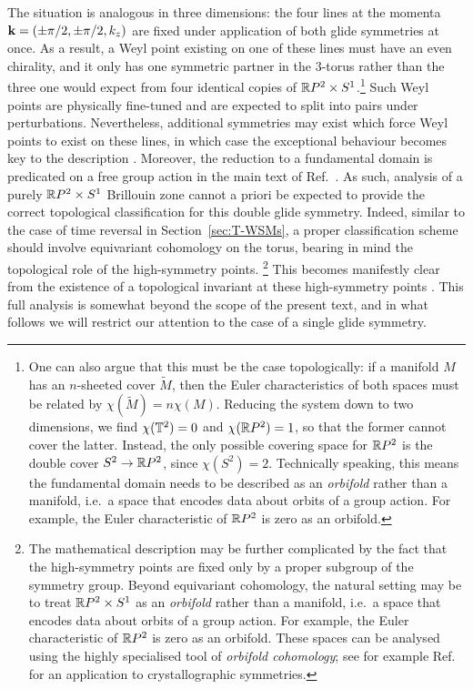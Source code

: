 The situation is analogous in three dimensions: the four lines at the momenta $\vb{k} = (\pm\pi/2,\pm\pi/2,k_z)$ are fixed under application of both glide symmetries at once. As a result, a Weyl point existing on one of these lines must have an even chirality, and it only has one symmetric partner in the 3-torus rather than the three one would expect from four identical copies of $\mathbb{R} P^2\times S^1$.\footnote{
	One can also argue that this must be the case topologically: if a manifold $M$ has an $n$-sheeted cover $\tilde{M}$, then the Euler characteristics of both spaces must be related by $\chi(\tilde{M}) = n\chi(M)$. Reducing the system down to two dimensions, we find $\chi(\mathbb{T}^2) = 0$ and $\chi(\mathbb{R} P^2) = 1$, so that the former cannot cover the latter. Instead, the only possible covering space for $\mathbb{R} P^2$ is the double cover $S^2\to\mathbb{R} P^2$, since $\chi(S^2) = 2$. Technically speaking, this means the fundamental domain needs to be described as an \emph{orbifold} rather than a manifold, i.e.\ a space that encodes data about orbits of a group action. For example, the Euler characteristic of $\mathbb{R} P^2$ is zero as an orbifold.}
Such Weyl points are physically fine-tuned and are expected to split into pairs under perturbations. Nevertheless, additional symmetries may exist which force Weyl points to exist on these lines, in which case the exceptional behaviour becomes key to the description \cite{Leonhardt_symmetry-enforced}. Moreover, the reduction to a fundamental domain is predicated on a free group action in the main text of Ref.~\cite{Fonseca-Vaidya_nonorientable}. As such, analysis of a purely $\mathbb{R} P^2\times S^1$ Brillouin zone cannot a priori be expected to provide the correct topological classification for this double glide symmetry. Indeed, similar to the case of time reversal in Section~\ref{sec:T-WSMs}, a proper classification scheme should involve equivariant cohomology on the torus, bearing in mind the topological role of the high-symmetry points.
 \footnote{The mathematical description may be further complicated by the fact that the high-symmetry points are fixed only by a proper subgroup of the symmetry group. Beyond equivariant cohomology, the natural setting may be to treat $\mathbb{R} P^2\times S^1$ as an \emph{orbifold} rather than a manifold, i.e.\ a space that encodes data about orbits of a group action. For example, the Euler characteristic of $\mathbb{R} P^2$ is zero as an orbifold. These spaces can be analysed using the highly specialised tool of \emph{orbifold cohomology}; see for example Ref.~\cite{Adem_orbifold-cohomology} for an application to crystallographic symmetries.}
This becomes manifestly clear from the existence of a topological invariant at these high-symmetry points \cite{HZY_RP2,WangZhang_acoustic-Klein-2D}. This full analysis is somewhat beyond the scope of the present text, and in what follows we will restrict our attention to the case of a single glide symmetry.

